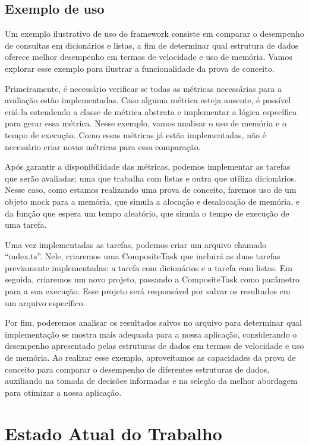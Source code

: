 \documentclass[12pt]{tcc}
\begin{document}
\section{Exemplo de uso}
Um exemplo ilustrativo de uso do framework consiste em comparar o desempenho de consultas em dicionários e listas, a fim de determinar qual estrutura de dados oferece melhor desempenho em termos de velocidade e uso de memória. Vamos explorar esse exemplo para ilustrar a funcionalidade da prova de conceito.

Primeiramente, é necessário verificar se todas as métricas necessárias para a avaliação estão implementadas. Caso alguma métrica esteja ausente, é possível criá-la estendendo a classe de métrica abstrata e implementar a lógica específica para gerar essa métrica. Nesse exemplo, vamos analisar o uso de memória e o tempo de execução. Como essas métricas já estão implementadas, não é necessário criar novas métricas para essa comparação.

Após garantir a disponibilidade das métricas, podemos implementar as tarefas que serão avaliadas: uma que trabalha com listas e outra que utiliza dicionários. Nesse caso, como estamos realizando uma prova de conceito, faremos uso de um objeto mock para a memória, que simula a alocação e desalocação de memória, e da função que espera um tempo aleatório, que simula o tempo de execução de uma tarefa.

Uma vez implementadas as tarefas, podemos criar um arquivo chamado ``index.ts''. Nele, criaremos uma CompositeTask que incluirá as duas tarefas previamente implementadas: a tarefa com dicionários e a tarefa com listas. Em seguida, criaremos um novo projeto, passando a CompositeTask como parâmetro para a sua execução. Esse projeto será responsável por salvar os resultados em um arquivo específico.

Por fim, poderemos analisar os resultados salvos no arquivo para determinar qual implementação se mostra mais adequada para a nossa aplicação, considerando o desempenho apresentado pelas estruturas de dados em termos de velocidade e uso de memória. Ao realizar esse exemplo, aproveitamos as capacidades da prova de conceito para comparar o desempenho de diferentes estruturas de dados, auxiliando na tomada de decisões informadas e na seleção da melhor abordagem para otimizar a nossa aplicação.

\chapter{Estado Atual do Trabalho}
\label{cap:estado_atual}
\end{document}
